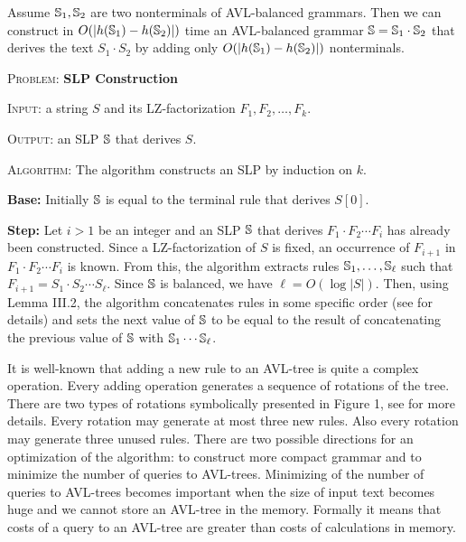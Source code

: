 ﻿\documentclass[10pt, conference, compsocconf]{IEEEtran}
\begin{document}
\begin{lem}
Assume $\mathbb{S}_1, \mathbb{S}_2$ are two nonterminals of AVL-balanced grammars.
Then we can construct in $O(|h(\mathbb{S}_1) - h(\mathbb{S}_2)|)$ time an
AVL-balanced grammar $\mathbb{S} = \mathbb{S}_1 \cdot \mathbb{S}_2$ that derives the
text $S_1\cdot S_2$ by adding only $O(|h(\mathbb{S}_1) - h(\mathbb{S}_2)|)$
nonterminals.
\end{lem}


\noindent \textsc{Problem:} \textbf{SLP Construction}

\noindent \textsc{Input:} a string $S$ and its LZ-factorization $F_1, F_2,
\dots, F_k$.

\noindent \textsc{Output:} an SLP $\mathbb{S}$ that derives $S$.

\noindent \textsc{Algorithm:} The algorithm constructs an SLP by induction on
$k$.

\textbf{Base:} Initially $\mathbb{S}$ is equal to the terminal rule that derives
$S[0]$.

\textbf{Step:} Let $i > 1$ be an integer and an SLP $\mathbb{S}$ that derives
$F_1\cdot F_2 \cdots F_i$ has already been constructed. Since a
LZ-factorization of $S$ is fixed, an occurrence of $F_{i+1}$ in $F_1\cdot F_2
\cdots F_i$ is known. From this, the algorithm extracts rules $\mathbb{S}_1,
\dots, \mathbb{S}_\ell$ such that $F_{i+1} = S_1 \cdot S_2 \cdots S_\ell$. Since
$\mathbb{S}$ is balanced, we have $\ell = O(\log |S|)$. Then, using Lemma III.2,
the algorithm concatenates rules in some specific order (see
\cite{SLPConstruction} for details) and sets the next value of $\mathbb{S}$ to be
equal to the result of concatenating the previous value of $\mathbb{S}$ with
$\mathbb{S}_1 \cdots \mathbb{S}_\ell$.

\begin{figure}[th]
\AVLrotations
\end{figure}

It is well-known that adding a new rule to an AVL-tree is quite a complex
operation. Every adding operation generates a sequence of rotations of the
tree. There are two types of rotations symbolically presented in Figure 1, see
\cite{SLPConstruction} for more details. Every rotation may generate at most
three new rules. Also every rotation may generate three unused rules. There are
two possible directions for an optimization of the algorithm: to construct more
compact grammar and to minimize the number of queries to AVL-trees. Minimizing
of the number of queries to AVL-trees becomes important when the size of input
text becomes huge and we cannot store an AVL-tree in the memory. Formally it
means that costs of a query to an AVL-tree are greater than costs of
calculations in memory.
\end{document}
